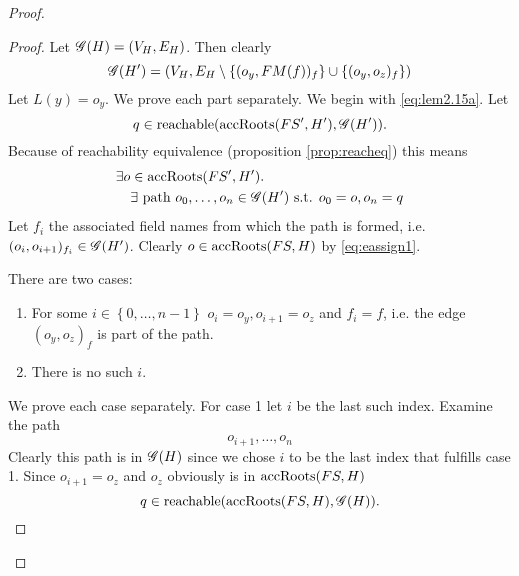 \begin{proof}
\begin{description}
\begin{description}
\begin{description}
              \begin{proof}
                Let $\mathscr{G}(H) = (V_H, E_H)$. Then clearly
                \begin{equation}
                  \mathscr{G}(H') = \left(V_H, E_H \setminus \{(o_y, FM(f))_f \} \cup
                  \{(o_y, o_z)_f \} \right)
                \end{equation}
                Let $L(y) = o_y$. We prove each part separately. 
                We begin with \eqref{eq:lem2.15a}.  Let
                \begin{equation*}
                  q \in \mbox{$\mathrm{reachable}$}(\mbox{$\mathrm{accRoots}$}(FS', H'), \mathscr{G}(H')).
                \end{equation*}
                Because of reachability equivalence (proposition
                \ref{prop:reacheq}) this means
                \begin{equation}
                  \begin{aligned}
                    \exists o &\in \mbox{$\mathrm{accRoots}$}(FS', H'). \\
                    & \exists \text{ path } o_0, \dots, o_n \in \mathscr{G}(H')
                    \text{ s.t. } o_0 = o, o_n = q
                  \end{aligned}
                \end{equation}
                Let $f_i$ the associated field names from which the path is
                formed, i.e. $(o_i, o_{i+1})_{f_i} \in \mathscr{G}(H')$.
                Clearly $o \in \mbox{$\mathrm{accRoots}$}(FS, H)$ by \eqref{eq:eassign1}. 

                There are two cases:
                \begin{enumerate}
                  \item For some $i \in \left\{ 0, \dots, n-1 \right\}$ $o_i =
                    o_y, o_{i+1} = o_z$ and $f_i = f$, i.e. the edge $(o_y,
                    o_z)_{f}$ is part of the path.
                  \item There is no such $i$.
                \end{enumerate}
                We prove each case separately. For case 1 let $i$ be the last
                such index. Examine the path 
                \begin{equation}
                  o_{i+1}, \dots, o_n
                \end{equation}
                Clearly this path is in $\mathscr{G}(H)$ since we chose $i$ to be the
                last index that fulfills case 1.  Since $o_{i+1} = o_z$ and
                $o_z$ obviously is in $\mbox{$\mathrm{accRoots}$}(FS, H)$
                \begin{equation}
                  q \in \mbox{$\mathrm{reachable}$}(\mbox{$\mathrm{accRoots}$}(FS, H), \mathscr{G}(H)).
                \end{equation}


\end{proof}
\end{description}
\end{description}
\end{description}
\end{proof}
